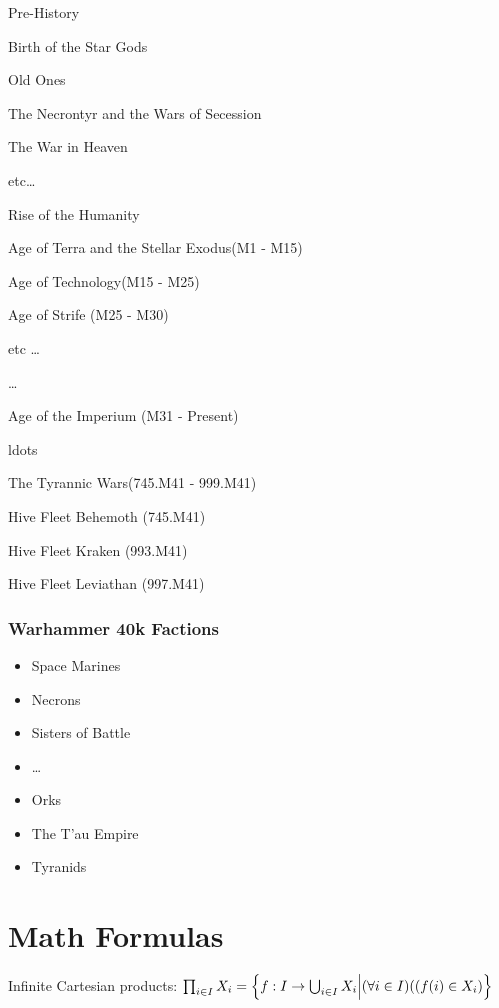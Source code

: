\documentclass{report}
\begin{document}
\begin{myList}
    \item Pre-History
    \begin{myList}
        \item Birth of the Star Gods
        \item Old Ones
        \item The Necrontyr and the Wars of Secession
        \item The War in Heaven
        \item etc\ldots
    \end{myList}
    \item Rise of the Humanity
    \begin{myList}
        \item Age of Terra and the Stellar Exodus(M1 - M15)
        \item Age of Technology(M15 - M25)
        \item Age of Strife (M25 - M30)
        \item etc \ldots
    \end{myList}
    \ldots
    \item Age of the Imperium (M31 - Present)
    \begin{myList}
        \item ldots
        \item The Tyrannic Wars(745.M41 - 999.M41)
        \begin{myList}
            \item Hive Fleet Behemoth (745.M41)
            \item Hive Fleet Kraken (993.M41)
            \item Hive Fleet Leviathan (997.M41)
        \end{myList}
    \end{myList}
\end{myList}

\subsection{Warhammer 40k Factions}
\begin{itemize}
    \item Space Marines
    \item Necrons
    \item Sisters of Battle
    \item \ldots
    \item Orks
    \item The T'au Empire
    \item Tyranids
\end{itemize}

\chapter{Math Formulas}
Infinite Cartesian products: $\prod_{i\in I} X_i =\Bigl\{ f:I\rightarrow\bigcup_{i\in I} X_i \Big| (\forall i \in I)((f(i)\in X_i) \Bigl\}$
\end{document}
